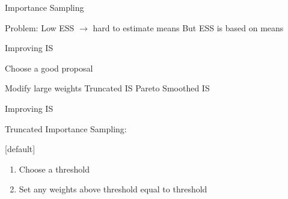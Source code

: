 \documentclass[14pt]{beamer}
\newcommand{\bE}{\mathbb{E}}
\begin{document}
\begin{frame}{Importance Sampling}
    \begin{outline}
        \1 Problem: Low ESS $\rightarrow$ hard to estimate means \newline
        \1 But ESS is based on means
            \2 \citep{Cha18}
    \end{outline}
\end{frame}




\begin{frame}{Improving IS}
    \begin{outline}
        \1 Choose a good proposal \newline
        
        \1 Modify large weights        
            \2 Truncated IS
            \2 Pareto Smoothed IS
    \end{outline}
\end{frame}

\begin{frame}{Improving IS}
    \begin{outline}
        \1 Truncated Importance Sampling:
            \2 \citep{Ion08} \newline
    \end{outline}

    [default]
    \begin{enumerate}
        \item Choose a threshold
        \item Set any weights above threshold equal to threshold
    \end{enumerate}
\end{frame}
\end{document}
